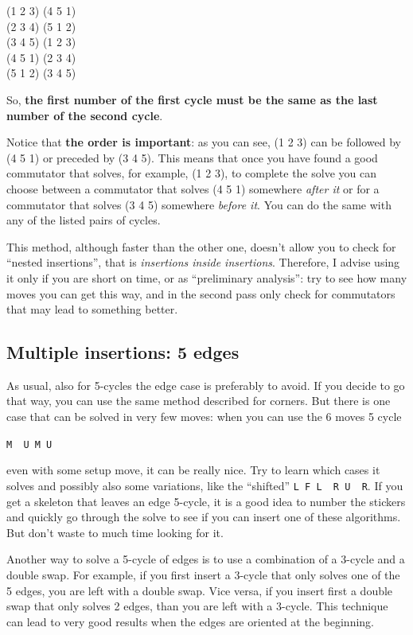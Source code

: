 \documentclass[11pt,a4paper]{book}
\newcommand{\p}{\textquotesingle}
\newcommand{\m}{\texttt}
\newcommand{\ps}{\p\,\,}
\begin{document}
\begin{center}
(1 2 3) (4 5 1)\\
(2 3 4) (5 1 2)\\
(3 4 5) (1 2 3)\\
(4 5 1) (2 3 4)\\
(5 1 2) (3 4 5)\\
\end{center}

So, \textbf{the first number of the first cycle must be the same as the last number of the second cycle}.

Notice that \textbf{the order is important}: as you can see, (1 2 3) can be followed by (4 5 1) or preceded by (3 4 5). This means that once you have found a good commutator that solves, for example, (1 2 3), to complete the solve you can choose between a commutator that solves (4 5 1) somewhere \emph{after it} or for a commutator that solves (3 4 5) somewhere \emph{before it}. You can do the same with any of the listed pairs of cycles.

This method, although faster than the other one, doesn't allow you to check for ``nested insertions'', that is \emph{insertions inside insertions}. Therefore, I advise using it only if you are short on time, or as ``preliminary analysis'': try to see how many moves you can get this way, and in the second pass only check for commutators that may lead to something better.

\subsection{Multiple insertions: 5 edges}
\label{sec:5e}

As usual, also for 5-cycles the edge case is preferably to avoid. If you decide to go that way, you can use the same method described for corners.
But there is one case that can be solved in very few moves: when you can use the 6 moves 5 cycle
\begin{center}
\m{M\ps U M U\p}
\end{center}
even with some setup move, it can be really nice. Try to learn which cases it solves and possibly also some variations, like the ``shifted'' \m{L F L\ps R U\ps R\p}. If you get a skeleton that leaves an edge 5-cycle, it is a good idea to number the stickers and quickly go through the solve to see if you can insert one of these algorithms. But don't waste to much time looking for it.

Another way to solve a 5-cycle of edges is to use a combination of a 3-cycle and a double swap. For example, if you first insert a 3-cycle that only solves one of the 5 edges, you are left with a double swap. Vice versa, if you insert first a double swap that only solves 2 edges, than you are left with a 3-cycle. This technique can lead to very good results when the edges are oriented at the beginning.
\end{document}
